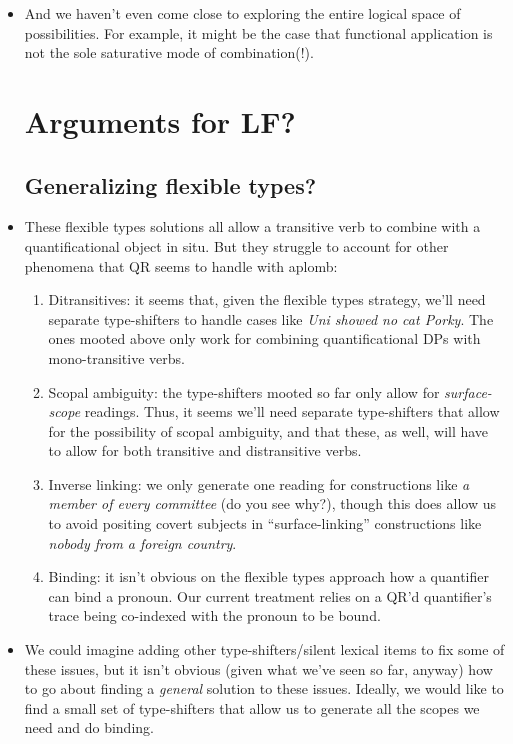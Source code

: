 \begin{itemize}
\item And we haven't even come close to exploring the entire logical space of possibilities. For example, it might be the case that functional application is not the sole saturative mode of combination(!).%


\section{Arguments for LF?} 

\subsection{Generalizing flexible types?}
\item These flexible types solutions all allow a transitive verb to combine with a quantificational object in situ. But they struggle to account for other phenomena that QR seems to handle with aplomb:%
\begin{enumerate}
\item Ditransitives: it seems that, given the flexible types strategy, we'll need separate type-shifters to handle cases like \emph{Uni showed no cat Porky}. The ones mooted above only work for combining quantificational DPs with mono-transitive verbs. %
\item Scopal ambiguity: the type-shifters mooted so far only allow for \emph{surface-scope} readings. Thus, it seems we'll need separate type-shifters that allow for the possibility of scopal ambiguity, and that these, as well, will have to allow for both transitive and distransitive verbs. %
\item Inverse linking: we only generate one reading for constructions like \emph{a member of every committee} (do you see why?), though this does allow us to avoid positing covert subjects in ``surface-linking'' constructions like \emph{nobody from a foreign country}.%
\item Binding: it isn't obvious on the flexible types approach how a quantifier can bind a pronoun. Our current treatment relies on a QR'd quantifier's trace being co-indexed with the pronoun to be bound.  %
\end{enumerate}

\item We could imagine adding other type-shifters/silent lexical items to fix some of these issues, but it isn't obvious (given what we've seen so far, anyway) how to go about finding a \emph{general} solution to these issues. Ideally, we would like to find a small set of type-shifters that allow us to generate all the scopes we need and do binding. %


\end{itemize}
